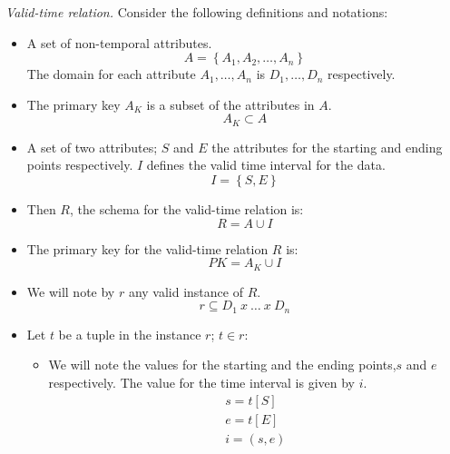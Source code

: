 \begin{definition}
\label{def:valid-time-relation}
\emph{Valid-time relation.}
Consider the following definitions and notations:

\begin{itemize}
 \item A set of non-temporal attributes.
	\begin{equation}
	\label{eq:attribute-set}
	A = \left \lbrace A_1, A_2, \ldots, A_n \right \rbrace
	\end{equation}
      The domain for each attribute $A_1, \ldots, A_n$ is $D_1, \ldots, D_n$ respectively. 
\item The primary key $A_K$ is a subset of the attributes in $A$.
      \begin{equation}
       \label{eq:primary-key-a}
      A_K \subset A
      \end{equation}
\item A set of two attributes; $S$  and $E$ the attributes for the starting and ending points respectively. $I$ defines the valid time interval for the data. 
\begin{equation}
 \label{eq:attribute-time-interval}
I = \left \lbrace S, E \right \rbrace
\end{equation}
\item Then $R$, the schema for the valid-time relation is:
\begin{equation}
 \label{eq:valid-time-relation}
R = A \cup  I
\end{equation}
\item The primary key for the valid-time relation $R$ is:
\begin{equation}
 \label{eq:valid-time-temporal-pk}
PK = A_K \cup I
\end{equation}


\item We will note by $r$ any valid instance of $R$. 
      \begin{equation}
       \label{eq:valid-time-instance}
      r \subseteq D_1\ x\ \ldots\ x\ D_n
      \end{equation}

\item Let $t$ be a tuple in the instance $r$; $t \in r$:
      \begin{itemize}
      \item We will note the values for the starting and the ending  points,$s$ and $e$  respectively. The value for the time interval is given by $i$.
      \begin{align}
       \label{eq:starting-point}
      s = t\left[S \right]\\
      e = t\left[E \right]\\
      i = \left(s, e\right)
      \end{align}



\end{itemize}
\end{itemize}
\end{definition}
